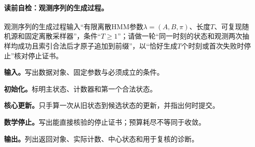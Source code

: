 \paragraph{读前自检：观测序列的生成过程。}观测序列的生成过程输入“有限离散HMM参数$\lambda=(A,B,\pi)$、长度$T$、可复现随机源和固定离散采样器”，条件“$T\ge1$”；请做一轮“同一时刻的状态和观测两次抽样均成功且索引合法后才原子追加到前缀”，以“恰好生成$T$个时刻或首次失败时停止”核对停止证书。\par


\begin{keypointbox}[title={HMM观测序列生成：五步阅读}]
\textbf{输入。}写出数据对象、固定参数与必须成立的条件。\par
\textbf{初始化。}标明主状态、计数器和第一个合法状态。\par
\textbf{核心更新。}只手算一次从旧状态到候选状态的更新，并指出何时提交。\par
\textbf{数学停止。}写出能直接核验的停止证书；预算耗尽不等同于收敛。\par
\textbf{输出。}列出返回对象、实际计数、中心状态和用于复核的诊断。
\end{keypointbox}


